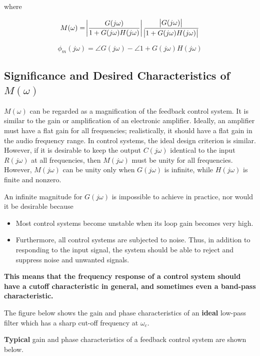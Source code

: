 \documentclass[
  14pt,
  a4paper,
  oneside,
  open=any,
  a4paper,
  14pt]{report}
\begin{document}
where

\[
M(\omega) = \abs{\dfrac{G(j\omega)}{1+G(j\omega)H(j\omega)}} \dfrac{\abs{G(j\omega)}}{\abs{1+G(j\omega)H(j\omega)}}
\]

\[
\phi_m (j\omega) = \angle G(j\omega) - \angle 1+G(j\omega) H(j\omega)
\]

\subsection{\texorpdfstring{Significance and Desired Characteristics of
\(M(\omega)\)}{Significance and Desired Characteristics of M(\textbackslash omega)}}\label{significance-and-desired-characteristics-of-momega}

\(M(\omega)\) can be regarded as a magnification of the feedback control
system. It is similar to the gain or amplification of an electronic
amplifier. Ideally, an amplifier must have a flat gain for all
frequencies; realistically, it should have a flat gain in the audio
frequency range. In control systems, the ideal design criterion is
similar. However, if it is desirable to keep the output \(C(j\omega)\)
identical to the input \(R(j\omega)\) at all frequencies, then
\(M(j\omega)\) must be unity for all frequencies. However,
\(M(j\omega)\) can be unity only when \(G(j\omega)\) is infinite, while
\(H(j\omega)\) is finite and nonzero.

An infinite magnitude for \(G(j\omega)\) is impossible to achieve in
practice, nor would it be desirable because

\begin{itemize}
\item
  Most control systems become unstable when its loop gain becomes very
  high.
\item
  Furthermore, all control systems are subjected to noise. Thus, in
  addition to responding to the input signal, the system should be able
  to reject and suppress noise and unwanted signals.
\end{itemize}

\textbf{This means that the frequency response of a control system
should have a cutoff characteristic in general, and sometimes even a
band-pass characteristic.}

The figure below shows the gain and phase characteristics of an
\textbf{ideal} low-pass filter which has a sharp cut-off frequency at
\(\omega_c\).

\textbf{Typical} gain and phase characteristics of a feedback control
system are shown below.
\end{document}
